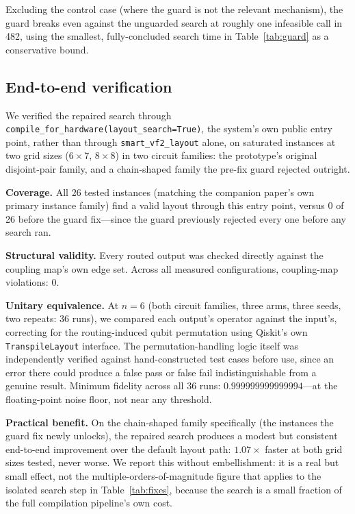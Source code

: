 \documentclass[11pt]{article}
\begin{document}
Excluding the control case (where the guard is not the relevant
mechanism), the guard breaks even against the unguarded search at
roughly one infeasible call in 482, using the smallest, fully-concluded
search time in Table~\ref{tab:guard} as a conservative bound.

\subsection{End-to-end verification}
\label{sec:e2e}

We verified the repaired search through
\texttt{compile\_for\_hardware(layout\_search=True)}, the system's own
public entry point, rather than through \texttt{smart\_vf2\_layout}
alone, on saturated instances at two grid sizes ($6\times7$, $8\times8$)
in two circuit families: the prototype's original disjoint-pair family,
and a chain-shaped family the pre-fix guard rejected outright.

\textbf{Coverage.} All 26 tested instances (matching the companion
paper's own primary instance family) find a valid layout through this
entry point, versus 0 of 26 before the guard fix---since the guard
previously rejected every one before any search ran.

\textbf{Structural validity.} Every routed output was checked directly
against the coupling map's own edge set. Across all measured
configurations, coupling-map violations: $0$.

\textbf{Unitary equivalence.} At $n=6$ (both circuit families, three
arms, three seeds, two repeats: 36 runs), we compared each output's
operator against the input's, correcting for the routing-induced qubit
permutation using Qiskit's own \texttt{TranspileLayout} interface. The
permutation-handling logic itself was independently verified against
hand-constructed test cases before use, since an error there could
produce a false pass or false fail indistinguishable from a genuine
result. Minimum fidelity across all 36 runs: $0.999999999999994$---at
the floating-point noise floor, not near any threshold.

\textbf{Practical benefit.} On the chain-shaped family specifically
(the instances the guard fix newly unlocks), the repaired search
produces a modest but consistent end-to-end improvement over the
default layout path: $1.07\times$ faster at both grid sizes tested,
never worse. We report this without embellishment: it is a real but
small effect, not the multiple-orders-of-magnitude figure that applies
to the isolated search step in Table~\ref{tab:fixes}, because the
search is a small fraction of the full compilation pipeline's own cost.
\end{document}

